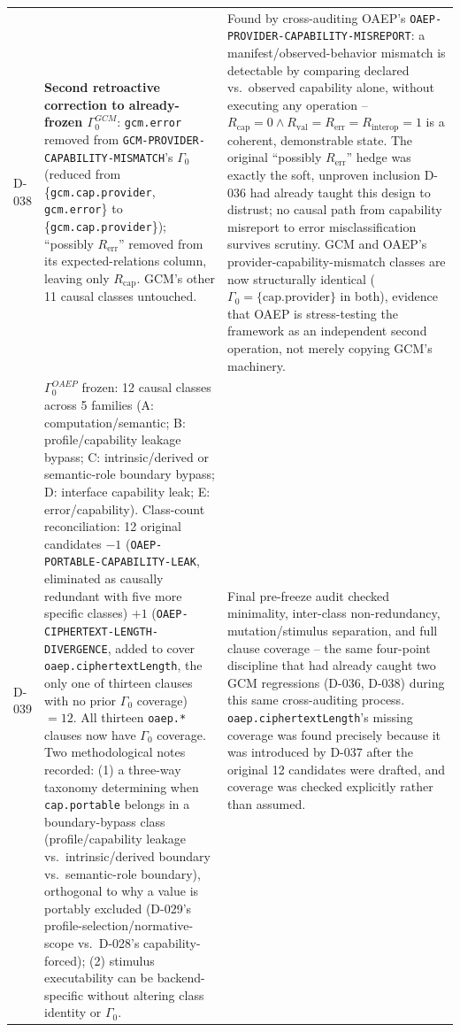 \documentclass[11pt,a4paper]{article}
\begin{document}
\begin{longtable}{@{}L{0.28\textwidth}L{0.34\textwidth}L{0.30\textwidth}@{}}
D-038 & \textbf{Second retroactive correction to already-frozen $\Gamma_0^{GCM}$}: \texttt{gcm.error} removed from \texttt{GCM-PROVIDER-CAPABILITY-MISMATCH}'s $\Gamma_0$ (reduced from \{\texttt{gcm.cap.provider}, \texttt{gcm.error}\} to \{\texttt{gcm.cap.provider}\}); ``possibly $R_{\text{err}}$'' removed from its expected-relations column, leaving only $R_{\text{cap}}$. GCM's other 11 causal classes untouched. & Found by cross-auditing OAEP's \texttt{OAEP-PROVIDER-CAPABILITY-MISREPORT}: a manifest/observed-behavior mismatch is detectable by comparing declared vs.\ observed capability alone, without executing any operation -- $R_{\text{cap}}=0 \land R_{\text{val}}=R_{\text{err}}=R_{\text{interop}}=1$ is a coherent, demonstrable state. The original ``possibly $R_{\text{err}}$'' hedge was exactly the soft, unproven inclusion D-036 had already taught this design to distrust; no causal path from capability misreport to error misclassification survives scrutiny. GCM and OAEP's provider-capability-mismatch classes are now structurally identical ($\Gamma_0=\{\text{cap.provider}\}$ in both), evidence that OAEP is stress-testing the framework as an independent second operation, not merely copying GCM's machinery.\\
D-039 & $\Gamma_0^{OAEP}$ frozen: 12 causal classes across 5 families (A: computation/semantic; B: profile/capability leakage bypass; C: intrinsic/derived or semantic-role boundary bypass; D: interface capability leak; E: error/capability). Class-count reconciliation: 12 original candidates $-1$ (\texttt{OAEP-PORTABLE-CAPABILITY-LEAK}, eliminated as causally redundant with five more specific classes) $+1$ (\texttt{OAEP-CIPHERTEXT-LENGTH-DIVERGENCE}, added to cover \texttt{oaep.ciphertextLength}, the only one of thirteen clauses with no prior $\Gamma_0$ coverage) $=12$. All thirteen \texttt{oaep.*} clauses now have $\Gamma_0$ coverage. Two methodological notes recorded: (1) a three-way taxonomy determining when \texttt{cap.portable} belongs in a boundary-bypass class (profile/capability leakage vs.\ intrinsic/derived boundary vs.\ semantic-role boundary), orthogonal to why a value is portably excluded (D-029's profile-selection/normative-scope vs.\ D-028's capability-forced); (2) stimulus executability can be backend-specific without altering class identity or $\Gamma_0$. & Final pre-freeze audit checked minimality, inter-class non-redundancy, mutation/stimulus separation, and full clause coverage -- the same four-point discipline that had already caught two GCM regressions (D-036, D-038) during this same cross-auditing process. \texttt{oaep.ciphertextLength}'s missing coverage was found precisely because it was introduced by D-037 after the original 12 candidates were drafted, and coverage was checked explicitly rather than assumed.\\

\end{longtable}
\end{document}

